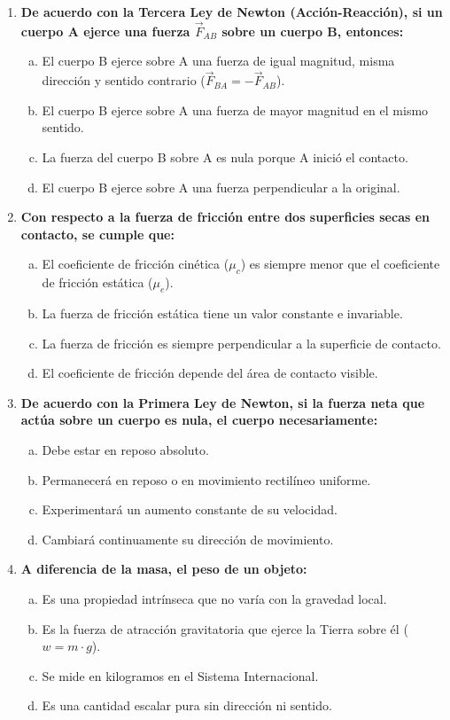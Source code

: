 \documentclass[11pt,a4paper]{article}
\begin{document}
\begin{enumerate}
    \item \textbf{De acuerdo con la Tercera Ley de Newton (Acción-Reacción), si un cuerpo A ejerce una fuerza $\vec{F}_{AB}$ sobre un cuerpo B, entonces:}
    \begin{enumerate}[a)]
        \item El cuerpo B ejerce sobre A una fuerza de igual magnitud, misma dirección y sentido contrario ($\vec{F}_{BA} = -\vec{F}_{AB}$).
        \item El cuerpo B ejerce sobre A una fuerza de mayor magnitud en el mismo sentido.
        \item La fuerza del cuerpo B sobre A es nula porque A inició el contacto.
        \item El cuerpo B ejerce sobre A una fuerza perpendicular a la original.
    \end{enumerate}

    \item \textbf{Con respecto a la fuerza de fricción entre dos superficies secas en contacto, se cumple que:}
    \begin{enumerate}[a)]
        \item El coeficiente de fricción cinética ($\mu_c$) es siempre menor que el coeficiente de fricción estática ($\mu_e$).
        \item La fuerza de fricción estática tiene un valor constante e invariable.
        \item La fuerza de fricción es siempre perpendicular a la superficie de contacto.
        \item El coeficiente de fricción depende del área de contacto visible.
    \end{enumerate}

    \item \textbf{De acuerdo con la Primera Ley de Newton, si la fuerza neta que actúa sobre un cuerpo es nula, el cuerpo necesariamente:}
    \begin{enumerate}[a)]
        \item Debe estar en reposo absoluto.
        \item Permanecerá en reposo o en movimiento rectilíneo uniforme.
        \item Experimentará un aumento constante de su velocidad.
        \item Cambiará continuamente su dirección de movimiento.
    \end{enumerate}

    \item \textbf{A diferencia de la masa, el peso de un objeto:}
    \begin{enumerate}[a)]
        \item Es una propiedad intrínseca que no varía con la gravedad local.
        \item Es la fuerza de atracción gravitatoria que ejerce la Tierra sobre él ($w = m \cdot g$).
        \item Se mide en kilogramos en el Sistema Internacional.
        \item Es una cantidad escalar pura sin dirección ni sentido.
    \end{enumerate}


\end{enumerate}
\end{document}
